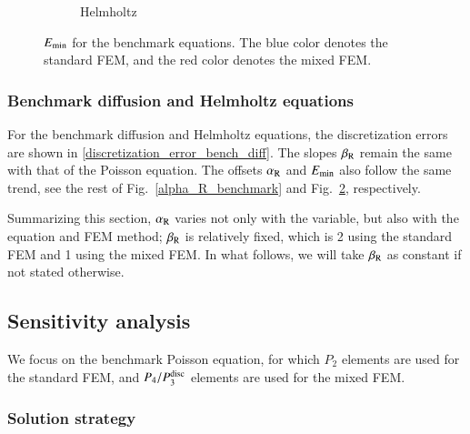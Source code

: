 \documentclass[review,3p]{elsarticle}
\begin{document}
\begin{figure}[!ht]
\begin{subfigure}[b]{0.35\textwidth}
{
}
\vspace{-0.2cm}
\caption{Helmholtz}
\label{E_min_benchmark_Helmholtz}
\end{subfigure}
\caption{$E_{\rm min}$ for the benchmark equations. The blue color denotes the standard FEM, and the red color denotes the mixed FEM.}
\label{E_min_benchmark}
\end{figure}

\subsubsection{Benchmark diffusion and Helmholtz equations}      \label{section_equation_type}

For the benchmark diffusion and Helmholtz equations, the discretization errors are shown in \ref{discretization_error_bench_diff}.
The slopes $\beta_{\rm R}$ remain the same with that of the Poisson equation.
The offsets $\alpha_{\rm R}$ and  $E_{\rm min}$ also follow the same trend, see the rest of Fig.~\ref{alpha_R_benchmark} and Fig.~\ref{E_min_benchmark}, respectively.

Summarizing this section, $\alpha_{\rm R}$ varies not only with the variable, but also with the equation and FEM method; $\beta_{\rm R}$ is relatively fixed, which is 2 using the standard FEM and 1 using the mixed FEM. In what follows, we will take $\beta_{\rm R}$ as constant if not stated otherwise.

\subsection{Sensitivity analysis}       \label{section_sensitivity}

We focus on the benchmark Poisson equation, for which $P_2$ elements are used for the standard FEM, and $P_4/P_3^{\rm disc}$ elements are used for the mixed FEM.

\subsubsection{Solution strategy}		\label{section_solver}
\end{document}
